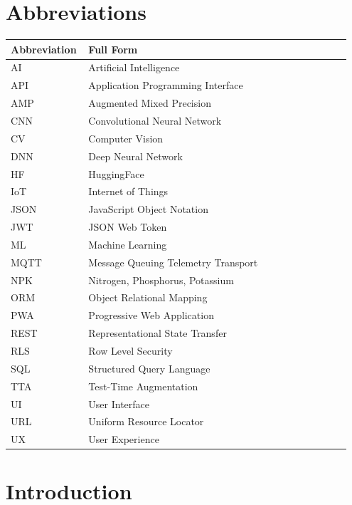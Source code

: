 \documentclass[12pt,a4paper]{report}
\begin{document}
\chapter*{Abbreviations}
\begin{longtable}{p{0.2\linewidth} p{0.75\linewidth}}
\toprule
\textbf{Abbreviation} & \textbf{Full Form} \\
\midrule
\endhead
AI    & Artificial Intelligence \\
API   & Application Programming Interface \\
AMP   & Augmented Mixed Precision \\
CNN   & Convolutional Neural Network \\
CV    & Computer Vision \\
DNN   & Deep Neural Network \\
HF    & HuggingFace \\
IoT   & Internet of Things \\
JSON  & JavaScript Object Notation \\
JWT   & JSON Web Token \\
ML    & Machine Learning \\
MQTT  & Message Queuing Telemetry Transport \\
NPK   & Nitrogen, Phosphorus, Potassium \\
ORM   & Object Relational Mapping \\
PWA   & Progressive Web Application \\
REST  & Representational State Transfer \\
RLS   & Row Level Security \\
SQL   & Structured Query Language \\
TTA   & Test-Time Augmentation \\
UI    & User Interface \\
URL   & Uniform Resource Locator \\
UX    & User Experience \\
\bottomrule
\end{longtable}

\newpage

\chapter{Introduction}
\end{document}
